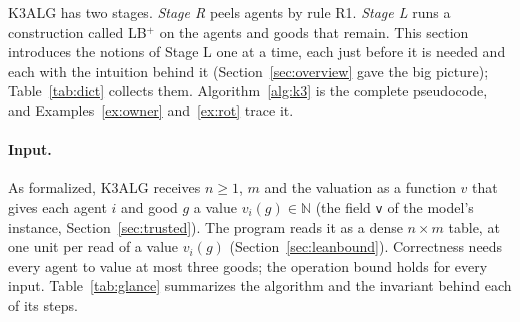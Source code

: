\documentclass[runningheads,11pt]{llncs}
\newcommand{\LBp}{\texorpdfstring{\mbox{LB$^{+}$}}{LB+}}
\begin{document}
K3ALG has two stages. \emph{Stage R} peels agents by rule R1. \emph{Stage L} runs a construction called \LBp{} on the agents and goods that remain. This section introduces the notions of Stage L one at a time, each just before it is needed and each with the intuition behind it (Section~\ref{sec:overview} gave the big picture); Table~\ref{tab:dict} collects them. Algorithm~\ref{alg:k3} is the complete pseudocode, and Examples~\ref{ex:owner} and~\ref{ex:rot} trace it.

\paragraph{Input.} As formalized, K3ALG receives $n\ge1$, $m$ and the valuation as a function $v$ that gives each agent $i$ and good $g$ a value $v_i(g)\in\mathbb{N}$ (the field \texttt{v} of the model's instance, Section~\ref{sec:trusted}). The program reads it as a dense $n\times m$ table, at one unit per read of a value $v_i(g)$ (Section~\ref{sec:leanbound}). Correctness needs every agent to value at most three goods; the operation bound holds for every input. Table~\ref{tab:glance} summarizes the algorithm and the invariant behind each of its steps.
\end{document}
